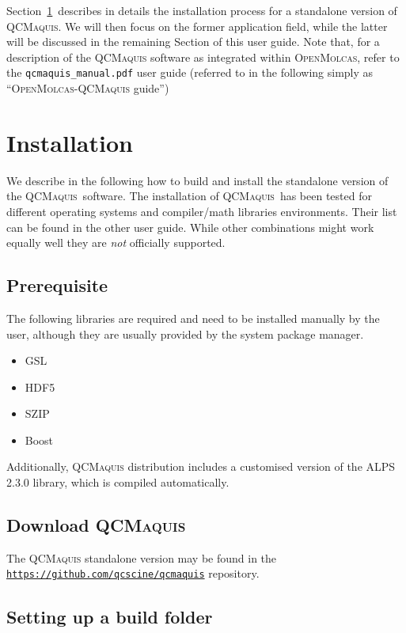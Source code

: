 \documentclass[bibliography=totoc,12pt,a4paper]{scrartcl}
\newcommand{\qcm}{\textsc{QCMaquis}}
\begin{document}
Section~\ref{sec:install-qcm-stand}\ describes in details the installation process for a standalone version of \qcm.
We will then focus on the former application field, while the latter will be discussed in the remaining Section of this user guide.
Note that, for a description of the \qcm{} software as integrated within \textsc{OpenMolcas}, refer to the \texttt{qcmaquis\_manual.pdf} user guide (referred to in the following simply as ``\textsc{OpenMolcas}-\qcm{} guide'')

\section{Installation}
\label{sec:install-qcm-stand}

\noindent We describe in the following how to build and install the standalone version of the \qcm\ software.
The installation of \qcm\ has been tested for different operating systems and compiler/math libraries environments.
Their list can be found in the other user guide.
While other combinations might work equally well they are \emph{not} officially supported.

\subsection{Prerequisite}
\label{subsec:requirements}

The following libraries are required and need to be installed manually by the user, although they are usually provided by the system package manager.

\begin{itemize}
 \item GSL
 \item HDF5
 \item SZIP
 \item Boost
\end{itemize}

Additionally, \qcm{} distribution includes a customised version of the ALPS 2.3.0 library, which is compiled automatically.

\subsection{Download \qcm}
\label{subsec:download-stand}

The \qcm{} standalone version may be found in the \texttt{\url{https://github.com/qcscine/qcmaquis}} repository.

\subsection{Setting up a build folder}
\end{document}
